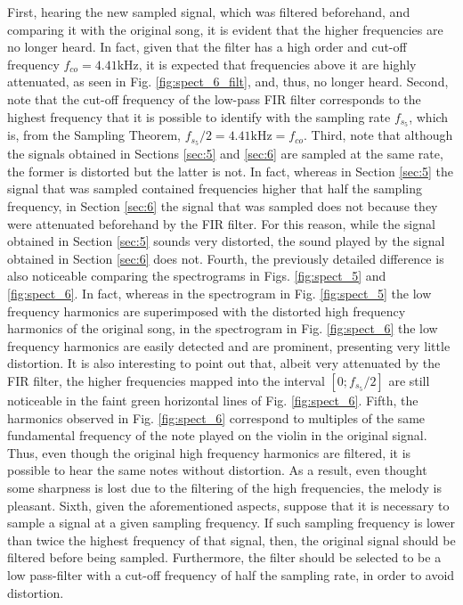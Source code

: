 \documentclass[a4paper, oneside, 11pt]{article}
\begin{document}
First, hearing the new sampled signal, which was filtered beforehand, and comparing it with the original song, it is evident that the higher frequencies are no longer heard. In fact, given that the filter has a high order and cut-off frequency $f_{co} = 4.41$kHz, it is expected that frequencies above it are highly attenuated, as seen in Fig. \ref{fig:spect_6_filt}, and, thus, no longer heard. Second, note that the cut-off frequency of the low-pass FIR filter corresponds to the highest frequency that it is possible to identify with the sampling rate $f_{s_5}$, which is, from the Sampling Theorem, $f_{s_5}/2 = 4.41\mathrm{kHz} = f_{co}$. Third, note that although the signals obtained in Sections \ref{sec:5} and \ref{sec:6} are sampled at the same rate, the former is distorted but the latter is not. In fact, whereas in Section \ref{sec:5} the signal that was sampled contained frequencies higher that half the sampling frequency, in Section \ref{sec:6} the signal that was sampled does not because they were attenuated beforehand by the FIR filter. For this reason, while the signal obtained in Section \ref{sec:5} sounds very distorted, the sound played by the signal obtained in Section \ref{sec:6} does not. Fourth, the previously detailed difference is also noticeable comparing the spectrograms in Figs. \ref{fig:spect_5} and \ref{fig:spect_6}. In fact, whereas in the spectrogram in Fig. \ref{fig:spect_5} the low frequency harmonics are superimposed with the distorted high frequency harmonics of the original song, in the spectrogram in Fig. \ref{fig:spect_6} the low frequency harmonics are easily detected and are prominent, presenting very little distortion. It is also interesting to point out that, albeit very attenuated by the FIR filter, the higher frequencies mapped into the interval $[0; f_{s_5}/2]$ are still noticeable in the faint green horizontal lines of Fig. \ref{fig:spect_6}. Fifth, the harmonics observed in Fig. \ref{fig:spect_6} correspond to multiples of the same fundamental frequency of the note played on the violin in the original signal. Thus, even though the original high frequency harmonics are filtered, it is possible to hear the same notes without distortion. As a result, even thought some sharpness is lost due to the filtering of the high frequencies, the melody is pleasant. Sixth, given the aforementioned aspects, suppose that it is necessary to sample a signal at a given sampling frequency. If such sampling frequency is lower than twice the highest frequency of that signal,  then, the original signal should be filtered before being sampled. Furthermore, the filter should be selected to be a low pass-filter with a cut-off frequency of half the sampling rate, in order to avoid distortion. 
\end{document}
